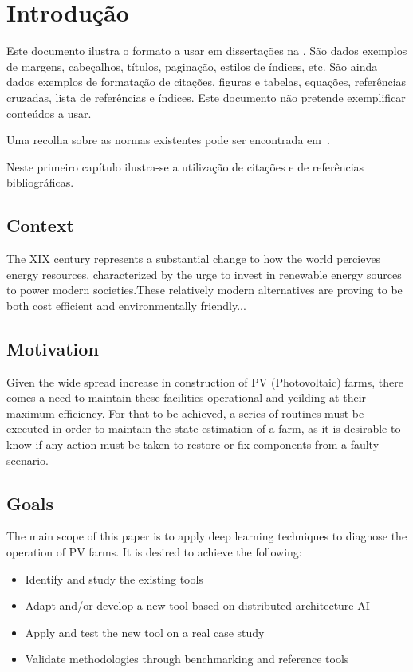 \chapter{Introdução} \label{chap:intro}

Este documento ilustra o formato a usar em dissertações na \Feup.
São dados exemplos de margens, cabeçalhos, títulos, paginação, estilos
de índices, etc. 
São ainda dados exemplos de formatação de citações, figuras e tabelas,
equações, referências cruzadas, lista de referências e índices.
Este documento não pretende exemplificar conteúdos a usar.

Uma recolha sobre as normas existentes pode ser encontrada em~\citet{kn:Mat93}.

Neste primeiro capítulo ilustra-se a utilização de citações e de
referências bibliográficas.

\section{Context} \label{sec:context}

The XIX century represents a substantial change to how the world percieves
energy resources, characterized by the urge to invest in renewable energy
sources to power modern societies.These relatively modern alternatives are
proving to be both cost efficient and environmentally friendly...

\section{Motivation} \label{sec:motivation}

Given the wide spread increase in construction of PV (Photovoltaic) farms, there
comes a need to maintain these facilities operational and yeilding at their
maximum efficiency. For that to be achieved, a series of routines must be
executed in order to maintain the state estimation of a farm, as it is desirable
to know if any action must be taken to restore or fix components from a faulty 
scenario.

\section{Goals} \label{sec:goals}

The main scope of this paper is to apply deep learning techniques to diagnose
the operation of PV farms. It is desired to achieve the following:

\begin{itemize}
  \item Identify and study the existing tools
  \item Adapt and/or develop a new tool based on distributed architecture AI
  \item Apply and test the new tool on a real case study
  \item Validate methodologies through benchmarking and reference tools
\end{itemize}


